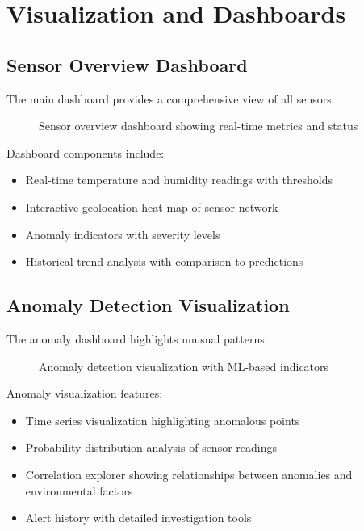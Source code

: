 \documentclass[11pt, a4paper]{article}
\begin{document}
\clearpage
\section{Visualization and Dashboards}

\subsection{Sensor Overview Dashboard}
The main dashboard provides a comprehensive view of all sensors:

\begin{figure}[H]
  \centering
  \caption{Sensor overview dashboard showing real-time metrics and status}
  \label{fig:dashboard}
\end{figure}

Dashboard components include:
\begin{itemize}[leftmargin=*]
  \item Real-time temperature and humidity readings with thresholds
  \item Interactive geolocation heat map of sensor network
  \item Anomaly indicators with severity levels
  \item Historical trend analysis with comparison to predictions
\end{itemize}

\subsection{Anomaly Detection Visualization}
The anomaly dashboard highlights unusual patterns:

\begin{figure}[H]
  \centering
  \caption{Anomaly detection visualization with ML-based indicators}
  \label{fig:anomaly}
\end{figure}

Anomaly visualization features:
\begin{itemize}[leftmargin=*]
  \item Time series visualization highlighting anomalous points
  \item Probability distribution analysis of sensor readings
  \item Correlation explorer showing relationships between anomalies and environmental factors
  \item Alert history with detailed investigation tools
\end{itemize}
\end{document}
